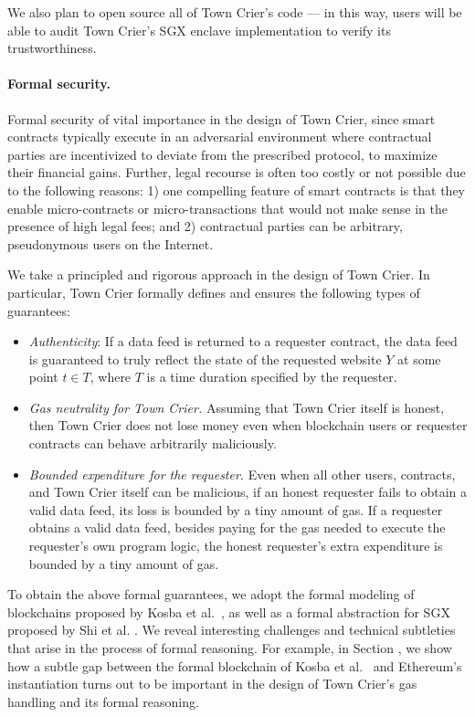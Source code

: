 We also plan to open source all of Town Crier's code --- in this way, 
users will be able to audit Town Crier's SGX enclave implementation
to verify its trustworthiness.


\paragraph{Formal security.}
Formal security of vital importance in the design of Town Crier, since
smart contracts  typically execute in an adversarial environment
where contractual parties are incentivized to 
deviate from the prescribed protocol, to maximize their financial gains.
Further, 
legal recourse is often too costly or 
not possible due to the following reasons:
1) one compelling feature of 
smart contracts is that they enable 
micro-contracts or micro-transactions that 
would not make sense in the presence of high legal fees;
and 2) contractual parties can be arbitrary, pseudonymous users on the Internet.

We take a principled and rigorous approach in the design of Town Crier. 
In particular, Town Crier formally defines and ensures  
the following types of guarantees:

\begin{itemize}[leftmargin=5mm]
\item
{\it Authenticity}: If a data feed is returned
to a requester contract, the data feed is guaranteed
to truly reflect the state of 
the requested website $Y$ 
at some point $t \in T$, where $T$ is a time duration specified 
by the requester.
\item
{\it Gas neutrality for Town Crier.} 
Assuming that Town Crier itself is honest, 
then Town Crier does not lose money   
even when blockchain users or requester contracts
can behave arbitrarily maliciously.
\item
{\it Bounded expenditure for the requester.} 
Even when all other users, contracts, and Town Crier itself 
can be malicious, 
if an honest requester  
fails to obtain a valid data feed, its loss is bounded by a tiny 
amount of gas.
If a requester obtains a valid data feed, besides paying for the gas
needed to execute the requester's own program logic, the honest requester's 
extra expenditure  
is bounded by a tiny amount of gas.
\end{itemize}

To obtain the above formal guarantees,
we adopt the formal modeling 
of blockchains proposed by Kosba et al.~\cite{hawk},
as well as a formal abstraction for SGX proposed by Shi et al. .
We reveal interesting challenges and technical subtleties
that arise in the process of formal reasoning.
For example, in Section , we show how 
a subtle gap between the formal blockchain
of Kosba et al.~\cite{hawk}
and Ethereum's instantiation  
turns out to be important in the design of Town Crier's
gas handling and its formal reasoning.  



